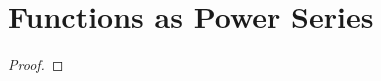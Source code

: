 \section{Functions as Power Series}
\label{pow}


\addtocounter{theorem}{3}
\begin{theorem} %
	\label{pow:t:diff_integr}
	\TBD
\end{theorem}


\addtocounter{exercise}{3}
\Newpage
\begin{exercise} %
	\label{pow:e:4}
	\TBD
\end{exercise}

\begin{proof}
	\TBD
\end{proof}